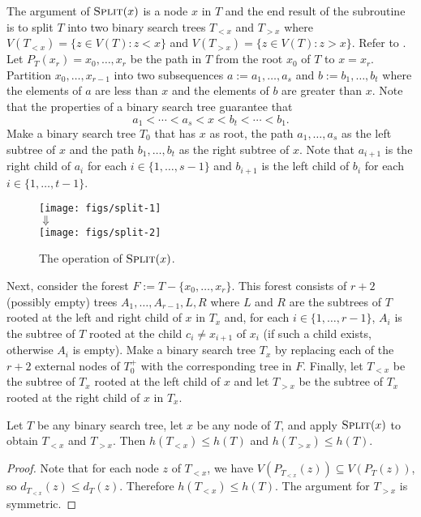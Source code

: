 \documentclass[kpfonts]{patmorin}
\let\le\leqslant
\begin{document}
The argument of $\textsc{Split}(x)$ is a node $x$ in $T$ and the end result of the subroutine is to split $T$ into two binary search trees $T_{<x}$ and $T_{>x}$ where $V(T_{<x})=\{z\in V(T): z<x\}$ and $V(T_{>x})=\{z\in V(T): z>x\}$. Refer to .  Let $P_T(x_r)=x_0,\ldots,x_r$ be the path in $T$ from the root $x_0$ of $T$ to $x=x_r$.  Partition $x_0,\ldots,x_{r-1}$ into two subsequences $a:=a_1,\ldots,a_s$ and $b:=b_1,\ldots,b_t$ where the elements of $a$ are less than $x$ and the elements of $b$ are greater than $x$.
Note that the properties of a binary search tree guarantee that
\[
a_1 < \cdots < a_s < x < b_t < \cdots < b_1.
\]
Make a binary search tree $T_0$ that has $x$ as root, the path $a_1,\ldots,a_s$ as the left subtree of $x$ and the path $b_1,\ldots,b_t$ as the right subtree of $x$.  Note that $a_{i+1}$ is the right child of $a_i$ for each $i\in\{1,\ldots,s-1\}$ and $b_{i+1}$ is the left child of $b_i$ for each $i\in\{1,\ldots,t-1\}$.

\begin{figure}
  \begin{center}
    \texttt{[image: figs/split-1]} \\[1ex]
    $\Downarrow$ \\[1ex]
    \texttt{[image: figs/split-2]}
  \end{center}
  \caption{The operation of $\textsc{Split}(x)$.}
\end{figure}

Next, consider the forest $F:=T-\{x_0,\ldots,x_r\}$. This forest consists of $r+2$ (possibly empty) trees $A_1,\ldots,A_{r-1},L,R$ where $L$ and $R$ are the subtrees of $T$ rooted at the left and right child of $x$ in $T_x$ and, for each $i\in\{1,\ldots,r-1\}$, $A_i$ is the subtree of $T$ rooted at the child $c_i\neq x_{i+1}$ of $x_i$ (if such a child exists, otherwise $A_i$ is empty).  Make a binary search tree $T_x$ by replacing each of the $r+2$ external nodes of $T_0^+$ with the corresponding tree in $F$.  Finally, let $T_{<x}$ be the subtree of $T_x$ rooted at the left child of $x$ and let $T_{>x}$ be the subtree of $T_x$ rooted at the right child of $x$ in $T_x$.

\begin{lem}
  Let $T$ be any binary search tree, let $x$ be any node of $T$, and apply $\textsc{Split}(x)$ to obtain $T_{<x}$ and $T_{>x}$.
  Then $h(T_{<x})\le h(T)$ and $h(T_{>x})\le h(T)$.
\end{lem}

\begin{proof}
  Note that for each node $z$ of $T_{<x}$, we have $V(P_{T_{<x}}(z))\subseteq V(P_T(z))$,
  so $d_{T_{<x}}(z)\le d_T(z)$.
  Therefore $h(T_{<x})\le h(T)$. The argument for $T_{>x}$ is symmetric.
\end{proof}
\end{document}
